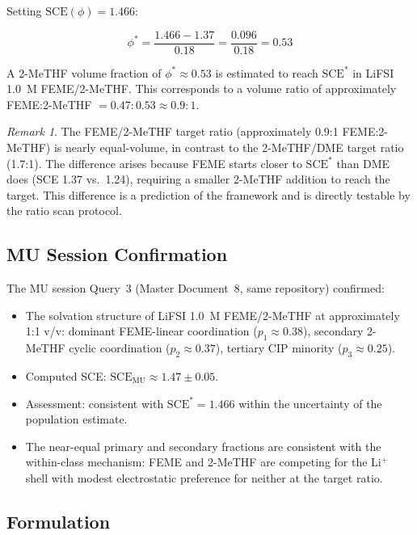 \documentclass[11pt]{article}
\theoremstyle{plain}
\theoremstyle{definition}
\theoremstyle{remark}
\newtheorem{remark}{Remark}[section]
\begin{document}
Setting $\mathrm{SCE}(\phi) = 1.466$:

\begin{equation}
  \phi^{*} = \frac{1.466 - 1.37}{0.18} = \frac{0.096}{0.18}
  = 0.53
  \label{eq:FEME_phi_star}
\end{equation}

A 2-MeTHF volume fraction of $\phi^{*} \approx 0.53$ is estimated
to reach $\mathrm{SCE}^{*}$ in LiFSI 1.0~M FEME/2-MeTHF.
This corresponds to a volume ratio of approximately
FEME:2-MeTHF $= 0.47:0.53 \approx 0.9:1$.

\begin{remark}
The FEME/2-MeTHF target ratio (approximately 0.9:1 FEME:2-MeTHF)
is nearly equal-volume, in contrast to the 2-MeTHF/DME target ratio
(1.7:1).  The difference arises because FEME starts closer to
$\mathrm{SCE}^{*}$ than DME does (SCE 1.37 vs.\ 1.24), requiring a
smaller 2-MeTHF addition to reach the target.  This difference is a
prediction of the framework and is directly testable by the ratio scan
protocol.
\end{remark}

\subsection{MU Session Confirmation}

The MU session Query~3 (Master Document~8, same repository) confirmed:
\begin{itemize}[leftmargin=2em]
  \item The solvation structure of LiFSI 1.0~M FEME/2-MeTHF at
        approximately 1:1 v/v: dominant FEME-linear coordination
        ($p_1 \approx 0.38$), secondary 2-MeTHF cyclic coordination
        ($p_2 \approx 0.37$), tertiary CIP minority ($p_3 \approx 0.25$).
  \item Computed SCE: $\mathrm{SCE}_\mathrm{MU} \approx 1.47 \pm 0.05$.
  \item Assessment: consistent with $\mathrm{SCE}^{*} = 1.466$ within
        the uncertainty of the population estimate.
  \item The near-equal primary and secondary fractions are consistent
        with the within-class mechanism: FEME and 2-MeTHF are competing
        for the Li$^+$ shell with modest electrostatic preference for
        neither at the target ratio.
\end{itemize}

\subsection{Formulation}
\end{document}
